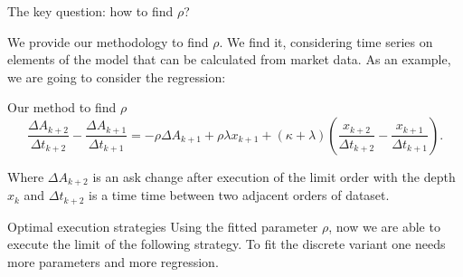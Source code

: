 \documentclass[]{beamer}
\begin{document}
\begin{frame}[t]
\begin{columns}[t]
\begin{column}{\onecolwid}
        \begin{block}{The key question: how to find $\rho$?}
        
            We provide our methodology to find $\rho$. We find it, considering time series on elements of the model 
            that can be calculated from market data. As an example, we are going to consider the regression:
            \begin{alertblock}{Our method to find $\rho$}
                \begin{equation*}
                    \frac{\Delta A_{k+2}}{\Delta t_{k+2}} - \frac{\Delta A_{k+1}}{\Delta t_{k+1}} 
            = - \rho \Delta A_{k+1} + \rho \lambda x_{k+1} + (\kappa + \lambda) (\frac{x_{k+2}}{\Delta t_{k+2}} - \frac{x_{k+1}}{\Delta t_{k+1}}).
                \end{equation*}
            \end{alertblock}
            Where $\Delta A_{k+2}$ is an ask change after execution of the limit order with the depth $x_k$ 
            and $\Delta t_{k+2}$ is a time time between two adjacent orders of dataset.

        \end{block}

        \begin{block}{Optimal execution strategies }
            Using the fitted parameter $\rho$, now we are able to execute the limit of the following strategy.
            To fit the discrete variant one needs more parameters and more regression. 


\end{block}
\end{column}
\end{columns}
\end{frame}
\end{document}
